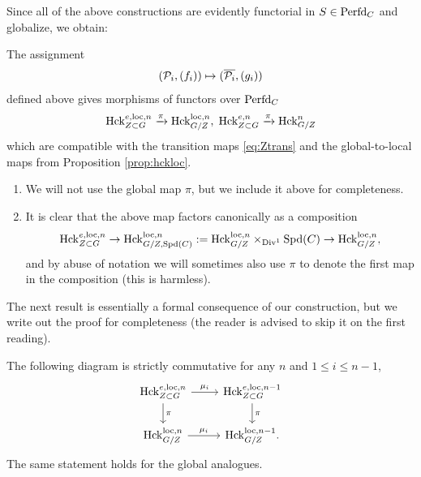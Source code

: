 Since all of the above constructions are evidently functorial in $S \in \mathrm{Perfd}_{C}$ and globalize, we obtain:
\begin{prop}\label{prop:Hckquot}
    The assignment
    \begin{equation*}
        (\mathcal{P}_{i},(f_{i})) \mapsto (\overline{\mathcal{P}_{i}}, (g_{i}))
    \end{equation*}
    defined above gives morphisms of functors over $\mathrm{Perfd}_{C}$
    \begin{equation*}
        \mathrm{Hck}_{Z \subset G}^{e,\mathrm{loc},n} \xrightarrow{\pi} \mathrm{Hck}_{G/Z}^{\mathrm{loc},n}, \hspace{1mm} \mathrm{Hck}_{Z \subset G}^{e,n} \xrightarrow{\pi} \mathrm{Hck}_{G/Z}^{n}
    \end{equation*}
    which are compatible with the transition maps \eqref{eq:Ztrans} and the global-to-local maps from Proposition \ref{prop:hckloc}.
\end{prop}

\begin{rque}
    \begin{enumerate}
        \item We will not use the global map $\pi$, but we include it above for completeness.
        \item It is clear that the above map factors canonically as a composition
        \begin{equation*}
             \mathrm{Hck}_{Z \subset G}^{e,\mathrm{loc},n} \to \mathrm{Hck}_{G/Z,\mathrm{Spd}(C)}^{\mathrm{loc},n} := \mathrm{Hck}_{G/Z}^{\mathrm{loc},n} \times_{\mathrm{Div}^{1}} \mathrm{Spd}(C) \to \mathrm{Hck}_{G/Z}^{\mathrm{loc},n}, 
        \end{equation*}
        and by abuse of notation we will sometimes also use $\pi$ to denote the first map in the composition (this is harmless).
    \end{enumerate}
\end{rque}

The next result is essentially a formal consequence of our construction, but we write out the proof for completeness (the reader is advised to skip it on the first reading).

\begin{prop}\label{prop:Hckconv}
    The following diagram is strictly commutative for any $n$ and $1 \leq i \leq n-1$,
    \[
    \begin{tikzcd}
    \Hck^{e,\loc,n}_{Z \subset G} \arrow["\mu_{i}"]{r} \arrow["\pi"]{d} & \Hck^{e,\loc,n-1}_{Z \subset G}  \arrow["\pi"]{d} \\
    \Hck^{\loc,n}_{G/Z} \arrow["\mu_{i}"]{r} & \Hck^{\loc,n-1}_{G/Z}.
    \end{tikzcd}
    \]
     The same statement holds for the global analogues.
\end{prop}


